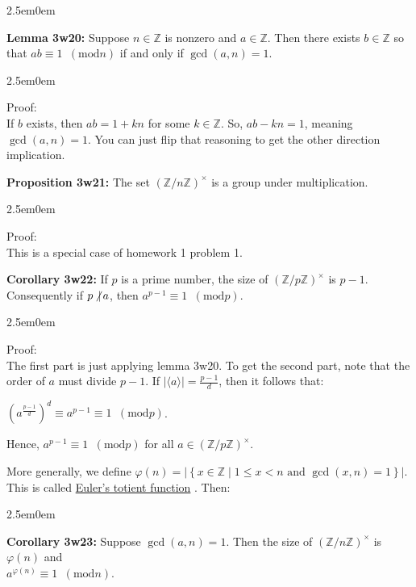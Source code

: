 \documentclass{book}
\newcommand{\hTwo}{%
\color{MidnightBlue}%
   \fontsize{13}{15}\selectfont%
}
\newcommand{\hThree}{%
   \color{PineGreen!85!Orange}
   \fontsize{12}{14}\selectfont%
}
\newenvironment{myIndent}{%
   \begin{adjustwidth}{2.5em}{0em}%
}{%
   \end{adjustwidth}%
}
\newcommand{\udefine}[1]{{%
   \setulcolor{Red}%
   \setul{0.14em}{0.07em}%
   \ul{#1}%
}}
\newcommand{\blab}[1]{\textbf{#1}}
\newcommand{\mMod}[1]{\phantom{a}(\mathrel{\mathrm{mod}} #1)}
\newcommand{\divides}{\mathop{\mid}}
\newcommand{\retTwo}{\hfill\bigbreak}
\begin{document}
{\begin{myIndent}\hTwo
	\blab{Lemma 3w20:} Suppose $n \in \mathbb{Z}$ is nonzero and $a \in \mathbb{Z}$. Then there exists $b \in \mathbb{Z}$ so that $ab \equiv 1 \mMod{n}$ if and only if $\gcd(a, n) = 1$.
	
	\begin{myIndent}\hThree
		Proof:\\
		If $b$ exists, then $ab = 1 + kn$ for some $k \in \mathbb{Z}$. So, $ab - kn = 1$, meaning\\ $\gcd(a, n) = 1$. You can just flip that reasoning to get the other direction\\ implication.\retTwo
	\end{myIndent}

	\blab{Proposition 3w21:} The set $(\mathbb{Z}/n\mathbb{Z})^\times$ is a group under multiplication.

	\begin{myIndent}\hThree
		Proof:\\
		This is a special case of homework 1 problem 1.\newpage
	\end{myIndent}

	\blab{Corollary 3w22:} If $p$ is a prime number, the size of $(\mathbb{Z}/p\mathbb{Z})^\times$ is $p - 1$. Consequently if $p \hspace{-0.1em}\not\divides a$, then $a^{p-1} \equiv 1 \mMod{p}$.

	\begin{myIndent}\hThree
		Proof:\\
		The first part is just applying lemma 3w20. To get the second part, note that the order of $a$ must divide $p - 1$. If $|\langle a \rangle| = \frac{p - 1}{d}$, then it follows that:
		
		{\centering $(a^{\frac{p - 1}{d}})^d \equiv a^{p-1} \equiv 1 \mMod{p}$.\retTwo\par}

		Hence, $a^{p-1} \equiv 1 \mMod{p}$ for all $a \in (\mathbb{Z}/p\mathbb{Z})^{\times}$.\retTwo
	\end{myIndent}
\end{myIndent}}

More generally, we define $\varphi(n) = |\left\{x \in \mathbb{Z} \mid 1 \leq x < n \text{ and } \gcd(x, n) = 1\right\}|$. This is called \udefine{Euler's totient function}. Then:

\begin{myIndent}\hTwo
	\blab{Corollary 3w23:} Suppose $\gcd(a, n) = 1$. Then the size of $(\mathbb{Z}/n\mathbb{Z})^\times$ is $\varphi(n)$ and\\ $a^{\varphi(n)} \equiv 1 \mMod{n}$.\retTwo
\end{myIndent}
\end{document}
